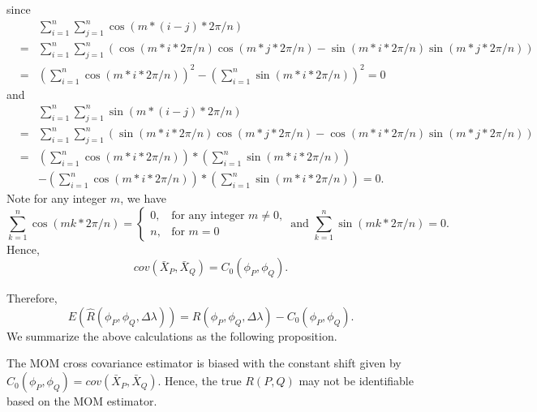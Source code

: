 since
			\begin{eqnarray*}
				& & \sum_{i = 1}^n \sum_{j=1}^n \cos(m*(i-j)*2\pi/n) \\
				&=& \sum_{i=1}^n \sum_{j=1}^n \left(\cos(m*i *2\pi/n)\cos(m*j*2\pi/n) - \sin(m*i *2\pi/n)\sin(m*j*2\pi/n) \right)\\
				&=& \left(\sum_{i=1}^n \cos(m*i *2\pi/n)\right)^2 - \left(\sum_{i=1}^n \sin(m*i *2\pi/n)\right)^2 = 0
			\end{eqnarray*}
and
			\begin{eqnarray*}
				& & \sum_{i = 1}^n \sum_{j=1}^n \sin(m*(i-j)*2\pi/n) \\
				&=& \sum_{i=1}^n \sum_{j=1}^n \left(\sin(m*i *2\pi/n)\cos(m*j*2\pi/n) - \cos(m*i *2\pi/n)\sin(m*j*2\pi/n) \right)\\
				&=& \left(\sum_{i=1}^n \cos(m*i *2\pi/n)\right)* \left(\sum_{i=1}^n \sin(m*i *2\pi/n)\right) \\
				& & - \left(\sum_{i=1}^n \cos(m*i *2\pi/n)\right)* \left(\sum_{i=1}^n \sin(m*i *2\pi/n)\right) = 0.
			\end{eqnarray*}
Note for any integer $m$, we have
			\[
				\sum_{k = 1}^{n} \cos(mk*2\pi/n) = \left\{\begin{array}{cc}
				0, & \mbox{for any integer $m \ne 0$,}  \\
				n, & \mbox{for $m = 0$}
				\end{array}
				\right. \mbox{ and }
				\sum_{k = 1}^{n} \sin(mk*2\pi/n) = 0.
			\]
Hence,
			\[
				cov(\bar{X}_P, \bar{X}_Q) = C_0 (\phi_P, \phi_Q).
			\]
				
Therefore,
			\[
				E(\hat{R}(\phi_P, \phi_Q, \Delta \lambda)) = R(\phi_P, \phi_Q, \Delta \lambda) - C_0 (\phi_P, \phi_Q).
			\]
We summarize the above calculations as the following proposition.
\begin{prop}
The MOM cross covariance estimator is biased with the constant shift given by $C_0(\phi_P, \phi_Q) = cov(\bar{X}_P, \bar{X}_Q)$. Hence, the true $R(P, Q)$ may not be identifiable based on the MOM estimator.  
\end{prop}
				
				
			
